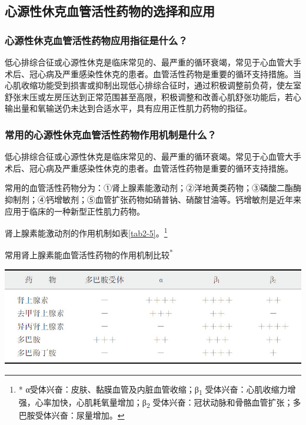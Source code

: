 \subsection{心源性休克血管活性药物的选择和应用}

\subsubsection{心源性休克血管活性药物应用指征是什么？}

低心排综合征或心源性休克是临床常见的、最严重的循环衰竭，常见于心血管大手术后、冠心病及严重感染性休克的患者。血管活性药物是重要的循环支持措施。当心肌收缩功能受到损害或抑制出现低心排综合征时，通过积极调整前负荷，使左室舒张末压或左房压达到正常范围甚至高限，积极调整和改善心肌舒张功能后，若心输出量和氧输送仍未达到合适水平，具有应用正性肌力药物的指征。

\subsubsection{常用的心源性休克血管活性药物作用机制是什么？}

低心排综合征或心源性休克是临床常见的、最严重的循环衰竭。常见于心血管大手术后、冠心病及严重感染性休克的患者。血管活性药物是重要的循环支持措施。

常用的血管活性药物分为：①肾上腺素能激动剂；②洋地黄类药物；③磷酸二酯酶抑制剂；④钙增敏剂；⑤血管扩张药物如硝普钠、硝酸甘油等。钙增敏剂是近年来应用于临床的一种新型正性肌力药物。

肾上腺素能激动剂的作用机制如表\ref{tab2-5}。\footnote{* α受体兴奋：皮肤、黏膜血管及内脏血管收缩；β\textsubscript{1}
受体兴奋：心肌收缩力增强，心率加快，心肌耗氧量增加；β\textsubscript{2}
受体兴奋：冠状动脉和骨骼血管扩张；多巴胺受体兴奋：尿量增加。}

\begin{table}[htbp]
\centering
\caption{常用肾上腺素能血管活性药物的作用机制比较\textsuperscript{*}}
\label{tab2-5}
\includegraphics[width=\textwidth,height=\textheight,keepaspectratio]{./images/Image00022.jpg}
\end{table}



